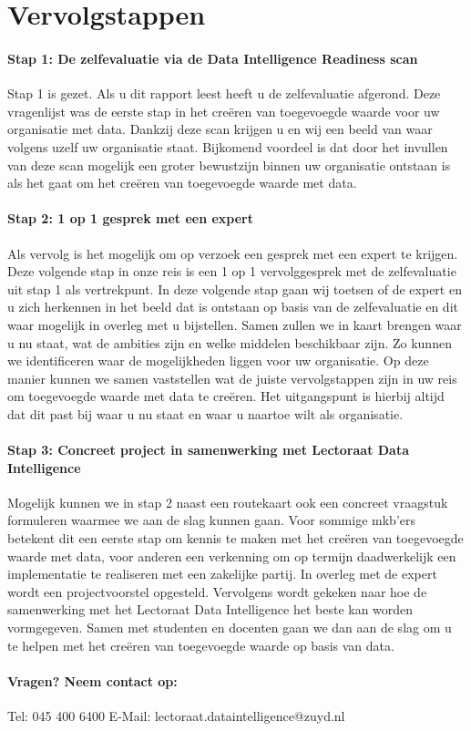 \chapter{Vervolgstappen}
\subsubsection{Stap 1: De zelfevaluatie via de Data Intelligence Readiness scan}

Stap 1 is gezet. Als u dit rapport leest heeft u de zelfevaluatie afgerond. Deze vragenlijst was de eerste stap in het creëren van toegevoegde waarde voor uw organisatie met data. Dankzij deze scan krijgen u en wij een beeld van waar volgens uzelf uw organisatie staat. Bijkomend voordeel is dat door het invullen van deze scan mogelijk een groter bewustzijn binnen uw organisatie ontstaan is als het gaat om het creëren van toegevoegde waarde met data. 

\subsubsection{Stap 2: 1 op 1 gesprek met een expert}

Als vervolg is het mogelijk om op verzoek een gesprek met een expert te krijgen. Deze volgende stap in onze reis is een 1 op 1 vervolggesprek met de zelfevaluatie uit stap 1 als vertrekpunt. In deze volgende stap gaan wij toetsen of de expert en u zich herkennen in het beeld dat is ontstaan op basis van de zelfevaluatie en dit waar mogelijk in overleg met u bijstellen. Samen zullen we in kaart brengen waar u nu staat, wat de ambities zijn en welke middelen beschikbaar zijn. Zo kunnen we identificeren waar de mogelijkheden liggen voor uw organisatie. Op deze manier kunnen we samen vaststellen wat de juiste vervolgstappen zijn in uw reis om toegevoegde waarde met data te creëren. Het uitgangspunt is hierbij altijd dat dit past bij waar u nu staat en waar u naartoe wilt als organisatie. 

\subsubsection{Stap 3: Concreet project in samenwerking met Lectoraat Data Intelligence}

Mogelijk kunnen we in stap 2 naast een routekaart ook een concreet vraagstuk formuleren waarmee we aan de slag kunnen gaan. Voor sommige mkb’ers betekent dit een eerste stap om kennis te maken met het creëren van toegevoegde waarde met data, voor anderen een verkenning om op termijn daadwerkelijk een implementatie te realiseren met een zakelijke partij. In overleg met de expert wordt een projectvoorstel opgesteld. Vervolgens wordt gekeken naar hoe de samenwerking met het Lectoraat Data Intelligence het beste kan worden vormgegeven. Samen met studenten en docenten gaan we dan aan de slag om u te helpen met het creëren van toegevoegde waarde op basis van data. 

\subsubsection{Vragen? Neem contact op:}

Tel: 045 400 6400 \newline
E-Mail: lectoraat.dataintelligence@zuyd.nl 
